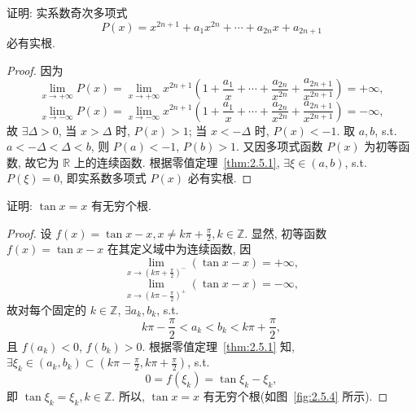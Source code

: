 \begin{example}\label{ex:2.5.4}
证明: 实系数奇次多项式
\[
P(x) = x^{2n+1} + a_1 x^{2n} + \cdots + a_{2n} x + a_{2n+1}
\]
必有实根.
\end{example}

\begin{proof}
因为
\[
\lim_{x \to +\infty} P(x) = \lim_{x \to +\infty} x^{2n+1}\left(1 + \frac{a_1}{x} + \cdots + \frac{a_{2n}}{x^{2n}} + \frac{a_{2n+1}}{x^{2n+1}}\right) = +\infty,
\]
\[
\lim_{x \to -\infty} P(x) = \lim_{x \to -\infty} x^{2n+1}\left(1 + \frac{a_1}{x} + \cdots + \frac{a_{2n}}{x^{2n}} + \frac{a_{2n+1}}{x^{2n+1}}\right) = -\infty,
\]
故 $\exists \Delta > 0$, 当 $x > \Delta$ 时, $P(x) > 1$; 当 $x < -\Delta$ 时, $P(x) < -1$. 取 $a, b$, s.t. $a < -\Delta < \Delta < b$, 则 $P(a) < -1$, $P(b) > 1$. 又因多项式函数 $P(x)$ 为初等函数, 故它为 $\mathbb{R}$ 上的连续函数. 根据零值定理~\ref{thm:2.5.1}, $\exists \xi \in (a,b)$, s.t. $P(\xi) = 0$, 即实系数多项式 $P(x)$ 必有实根.
\end{proof}

\begin{example}\label{ex:2.5.5}
证明: $\tan x = x$ 有无穷个根.
\end{example}

\begin{proof}
设 $f(x) = \tan x - x, x \neq k\pi + \frac{\pi}{2}, k \in \mathbb{Z}$. 显然, 初等函数 $f(x) = \tan x - x$ 在其定义域中为连续函数, 因
\[
\lim_{x \to \left(k\pi + \frac{\pi}{2}\right)^-} (\tan x - x) = +\infty,
\]
\[
\lim_{x \to \left(k\pi - \frac{\pi}{2}\right)^+} (\tan x - x) = -\infty,
\]
故对每个固定的 $k \in \mathbb{Z}$, $\exists a_k, b_k$, s.t.
\[
k\pi - \frac{\pi}{2} < a_k < b_k < k\pi + \frac{\pi}{2},
\]
且 $f(a_k) < 0$, $f(b_k) > 0$. 根据零值定理~\ref{thm:2.5.1} 知, $\exists \xi_k \in (a_k, b_k) \subset \left(k\pi - \frac{\pi}{2}, k\pi + \frac{\pi}{2}\right)$, s.t.
\[
0 = f(\xi_k) = \tan \xi_k - \xi_k,
\]
即 $\tan \xi_k = \xi_k, k \in \mathbb{Z}$. 所以, $\tan x = x$ 有无穷个根(如图~\ref{fig:2.5.4} 所示).
\end{proof}

